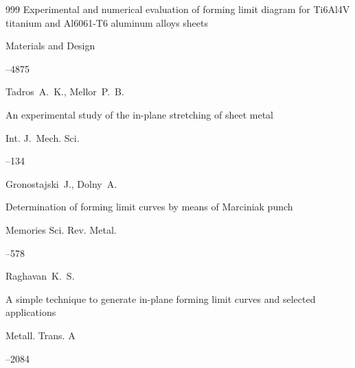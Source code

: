 \begin{thebibliography}{999}
\paper Experimental and numerical evaluation of forming limit diagram for Ti6Al4V titanium and Al6061-T6 aluminum alloys sheets

\jour Materials and Design




–4875






\by Tadros~A.~K., Mellor~P.~B.  

\paper An experimental study of the in-plane stretching of sheet metal

\jour Int. J.~Mech. Sci.




–134








\by Gronostajski~J., Dolny~A.  

\paper Determination of forming limit curves by means of Marciniak punch

\jour Memories Sci. Rev. Metal.



–578




\by Raghavan~K.~S.  

\paper A simple technique to generate in-plane forming limit curves and selected applications

\jour Metall. Trans. A




–2084






\end{thebibliography}

